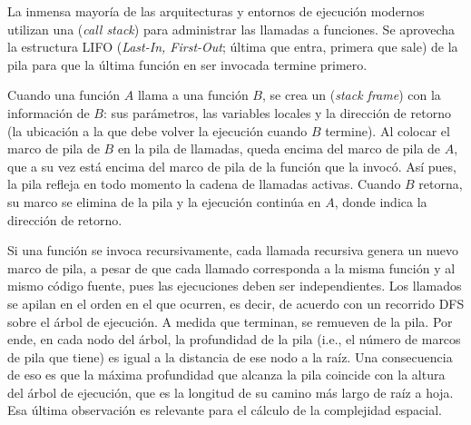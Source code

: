 La inmensa mayoría de las arquitecturas y entornos de ejecución modernos utilizan una  (\textit{call stack}) para administrar las llamadas a funciones. Se aprovecha la estructura LIFO (\textit{Last-In, First-Out}; última que entra, primera que sale) de la pila para que la última función en ser invocada termine primero.

Cuando una función $A$ llama a una función $B$, se crea un  (\textit{stack frame}) con la información de $B$: sus parámetros, las variables locales y la dirección de retorno (la ubicación a la que debe volver la ejecución cuando $B$ termine). Al colocar el marco de pila de $B$ en la pila de llamadas, queda encima del marco de pila de $A$, que a su vez está encima del marco de pila de la función que la invocó. Así pues, la pila refleja en todo momento la cadena de llamadas activas. Cuando $B$ retorna, su marco se elimina de la pila y la ejecución continúa en $A$, donde indica la dirección de retorno.

Si una función se invoca recursivamente, cada llamada recursiva genera un nuevo marco de pila, a pesar de que cada llamado corresponda a la misma función y al mismo código fuente, pues las ejecuciones deben ser independientes. Los llamados se apilan en el orden en el que ocurren, es decir, de acuerdo con un recorrido DFS sobre el árbol de ejecución. A medida que terminan, se remueven de la pila. Por ende, en cada nodo del árbol, la profundidad de la pila (i.e., el número de marcos de pila que tiene) es igual a la distancia de ese nodo a la raíz. Una consecuencia de eso es que la máxima profundidad que alcanza la pila coincide con la altura del árbol de ejecución, que es la longitud de su camino más largo de raíz a hoja. Esa última observación es relevante para el cálculo de la complejidad espacial.